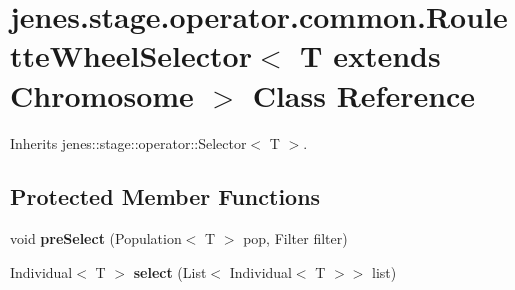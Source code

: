 \hypertarget{classjenes_1_1stage_1_1operator_1_1common_1_1_roulette_wheel_selector_3_01_t_01extends_01_chromosome_01_4}{
\section{jenes.stage.operator.common.RouletteWheelSelector$<$ T extends Chromosome $>$ Class Reference}
\label{classjenes_1_1stage_1_1operator_1_1common_1_1_roulette_wheel_selector_3_01_t_01extends_01_chromosome_01_4}
}
Inherits jenes::stage::operator::Selector$<$ T $>$.

\subsection*{Protected Member Functions}
\begin{CompactItemize}
\item 
\hypertarget{classjenes_1_1stage_1_1operator_1_1common_1_1_roulette_wheel_selector_3_01_t_01extends_01_chromosome_01_4_13a6b76fa77779367d05a063ff6191bf}{
void \textbf{preSelect} (Population$<$ T $>$ pop, Filter filter)}
\label{classjenes_1_1stage_1_1operator_1_1common_1_1_roulette_wheel_selector_3_01_t_01extends_01_chromosome_01_4_13a6b76fa77779367d05a063ff6191bf}

\item 
\hypertarget{classjenes_1_1stage_1_1operator_1_1common_1_1_roulette_wheel_selector_3_01_t_01extends_01_chromosome_01_4_d74c66e053cb97c75ce8a9f78a8208e5}{
Individual$<$ T $>$ \textbf{select} (List$<$ Individual$<$ T $>$$>$ list)}
\label{classjenes_1_1stage_1_1operator_1_1common_1_1_roulette_wheel_selector_3_01_t_01extends_01_chromosome_01_4_d74c66e053cb97c75ce8a9f78a8208e5}

\end{CompactItemize}

